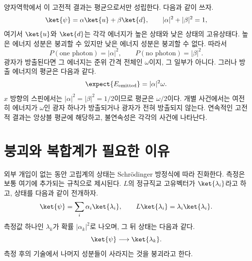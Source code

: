 양자역학에서 이 고전적 결과는 평균으로서만 성립한다. 다음과 같이 쓰자.
\begin{equation}
\ket{\psi}=\alpha\ket{u}+\beta\ket{d},
\qquad
|\alpha|^2+|\beta|^2=1,
\label{eq:l6-superposed-spin}
\end{equation}
여기서 \(\ket{u}\)와 \(\ket{d}\)는 각각 에너지가 높은 상태와 낮은 상태의 고유상태다. 높은 에너지 성분은 붕괴할 수 있지만 낮은 에너지 성분은 붕괴할 수 없다. 따라서
\begin{equation}
P(\text{one photon})=|\alpha|^2,
\qquad
P(\text{no photon})=|\beta|^2.
\end{equation}
광자가 방출된다면 그 에너지는 준위 간격 전체인 \(\omega\)이지, 그 일부가 아니다. 그러나 방출 에너지의 평균은 다음과 같다.
\begin{equation}
\expect{E_{\rm emitted}}=|\alpha|^2\omega.
\end{equation}
\(x\) 방향의 스핀에서는 \(|\alpha|^2=|\beta|^2=1/2\)이므로 평균은 \(\omega/2\)이다. 개별 사건에서는 여전히 에너지가 \(\omega\)인 광자 하나가 방출되거나 광자가 전혀 방출되지 않는다. 연속적인 고전적 결과는 앙상블 평균에 해당하고, 불연속성은 각각의 사건에 나타난다.

\begin{classroomqa}
\end{classroomqa}

\begin{classroomqa}
\end{classroomqa}

\section{붕괴와 복합계가 필요한 이유}

외부 개입이 없는 동안 고립계의 상태는 Schr\"odinger 방정식에 따라 진화한다. 측정은 보통 여기에 추가되는 규칙으로 제시된다. \(L\)의 정규직교 고유벡터가 \(\ket{\lambda_i}\)라고 하고, 상태를 다음과 같이 전개하자.
\begin{equation}
\ket{\psi}=\sum_i\alpha_i\ket{\lambda_i},
\qquad
L\ket{\lambda_i}=\lambda_i\ket{\lambda_i}.
\label{eq:l6-measurement-expansion}
\end{equation}
측정값 하나인 \(\lambda_k\)가 확률 \(|\alpha_k|^2\)로 나오며, 그 뒤 상태는 다음과 같다.
\begin{equation}
\ket{\psi}\longrightarrow\ket{\lambda_k}.
\label{eq:l6-collapse}
\end{equation}
측정 후의 기술에서 나머지 성분들이 사라지는 것을 붕괴라고 한다.

